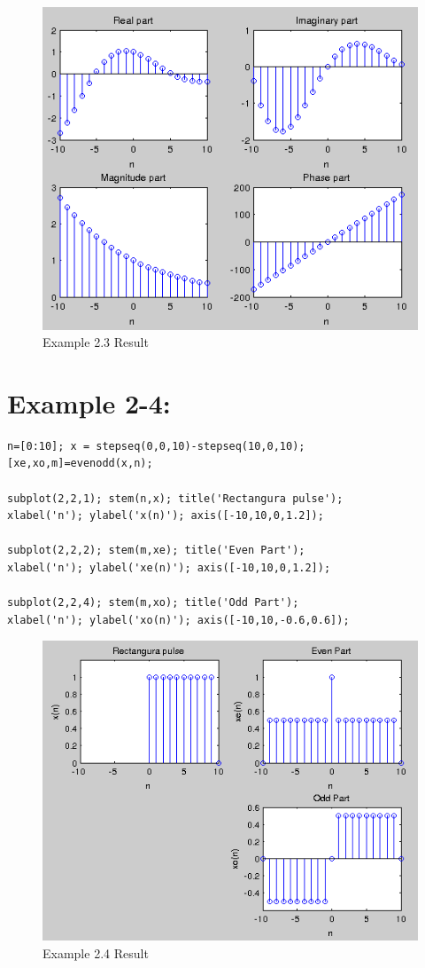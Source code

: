 \documentclass[11pt
  , a4paper
  , article
  , oneside
]{memoir}
\begin{document}
\begin{figure}[h!]
	\centering
	\includegraphics{./images/ex2-3.png}
	\caption{Example 2.3 Result}
	\label{fig:Example 2.3 Result} 
\end{figure}

\chapter{Example 2-4:}
\begin{lstlisting}[style=termstyle]
n=[0:10]; x = stepseq(0,0,10)-stepseq(10,0,10);
[xe,xo,m]=evenodd(x,n);

subplot(2,2,1); stem(n,x); title('Rectangura pulse');
xlabel('n'); ylabel('x(n)'); axis([-10,10,0,1.2]);

subplot(2,2,2); stem(m,xe); title('Even Part');
xlabel('n'); ylabel('xe(n)'); axis([-10,10,0,1.2]);

subplot(2,2,4); stem(m,xo); title('Odd Part');
xlabel('n'); ylabel('xo(n)'); axis([-10,10,-0.6,0.6]);
\end{lstlisting}

\begin{figure}[h!]
	\centering
	\includegraphics{./images/ex2-4.png}
	\caption{Example 2.4 Result}
	\label{fig:Example 2.4 Result} 
\end{figure}
\end{document}
